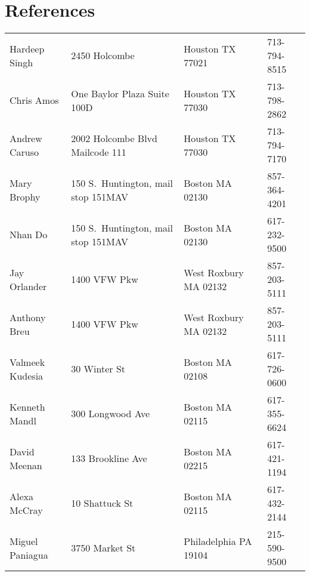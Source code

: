 \documentclass[10pt]{article}
\begin{document}
\section*{References}
\begin{tabular}{llll}

Hardeep Singh & 2450 Holcombe                   & Houston TX 77021 & 713-794-8515\\
Chris Amos    & One Baylor Plaza Suite 100D     & Houston TX 77030 & 713-798-2862\\
Andrew Caruso & 2002 Holcombe Blvd Mailcode 111 & Houston TX 77030 & 713-794-7170\\

Mary Brophy & 150 S.\ Huntington, mail stop 151MAV & Boston MA 02130 & 857-364-4201\\
Nhan Do     & 150 S.\ Huntington, mail stop 151MAV & Boston MA 02130 & 617-232-9500\\

Jay Orlander    & 1400 VFW Pkw      & West Roxbury MA 02132 & 857-203-5111\\
Anthony Breu    & 1400 VFW Pkw      & West Roxbury MA 02132 & 857-203-5111\\
Valmeek Kudesia & 30 Winter St      & Boston MA 02108       & 617-726-0600\\
Kenneth Mandl   & 300 Longwood Ave  & Boston MA 02115       & 617-355-6624\\
David Meenan    & 133 Brookline Ave & Boston MA 02215       & 617-421-1194\\
Alexa McCray    & 10 Shattuck St    & Boston MA 02115       & 617-432-2144\\
Miguel Paniagua & 3750 Market St    & Philadelphia PA 19104 & 215-590-9500
\end{tabular}
\end{document}
